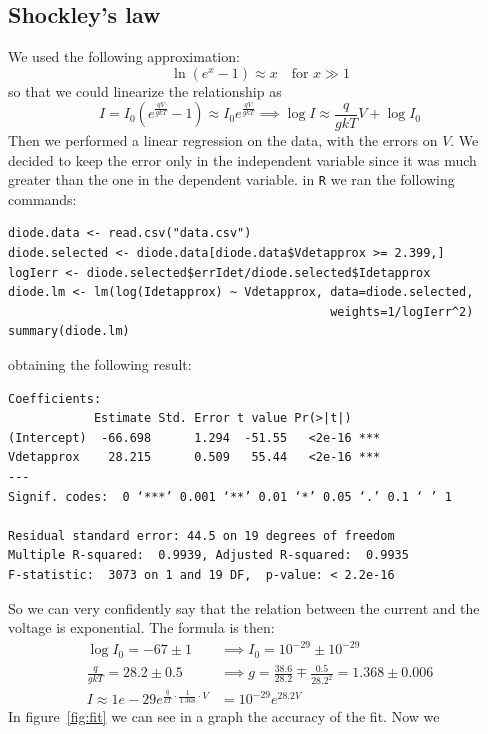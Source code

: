    \subsection{Shockley's law}
    We used the following approximation:
    \begin{equation}\label{eq:approx}
        \ln {(e^{x} - 1)} \approx x \quad \text{for } x \gg 1
    \end{equation}
    so that we could linearize the relationship as
    \[
        I = I_0 \left( e^{\frac{qV}{gkT}} - 1 \right) \approx I_0
        e^{\frac{qV}{gkT}} \implies \log I \approx \frac{q}{gkT} V + \log I_{0}
    \]
    Then we performed a linear regression on the data, with the errors on \(V\).
    We decided to keep the error only in the independent variable since it was
    much greater than the one in the dependent variable. 
   in \texttt{R} we ran the following commands:
   \begin{verbatim}
diode.data <- read.csv("data.csv")
diode.selected <- diode.data[diode.data$Vdetapprox >= 2.399,]
logIerr <- diode.selected$errIdet/diode.selected$Idetapprox
diode.lm <- lm(log(Idetapprox) ~ Vdetapprox, data=diode.selected,
                                             weights=1/logIerr^2)
summary(diode.lm)
   \end{verbatim}
   obtaining the following result:
   \begin{verbatim}
Coefficients:
            Estimate Std. Error t value Pr(>|t|)    
(Intercept)  -66.698      1.294  -51.55   <2e-16 ***
Vdetapprox    28.215      0.509   55.44   <2e-16 ***
---
Signif. codes:  0 ‘***’ 0.001 ‘**’ 0.01 ‘*’ 0.05 ‘.’ 0.1 ‘ ’ 1

Residual standard error: 44.5 on 19 degrees of freedom
Multiple R-squared:  0.9939, Adjusted R-squared:  0.9935 
F-statistic:  3073 on 1 and 19 DF,  p-value: < 2.2e-16  
   \end{verbatim}
   So we can very confidently say that the relation between the current and the
   voltage is exponential. The formula is then:
   \begin{align*}
       \log I_{0} = -67 \pm 1 &\implies I_{0} = 10^{-29} \pm 
       10^{-29} \\
       \frac{q}{gkT} = 28.2 \pm 0.5 &\implies g = \frac{38.6}{28.2} \mp
       \frac{0.5}{28.2^2} = 1.368 \pm 0.006 \\
       I \approx 1e-29 e^{\frac{q}{kT} \cdot \frac{1}{1.368} \cdot V} &= 10^{-29}
       e^{28.2 V}
   \end{align*}
   In figure~\ref{fig:fit} we can see in a graph the accuracy of the fit. Now we
